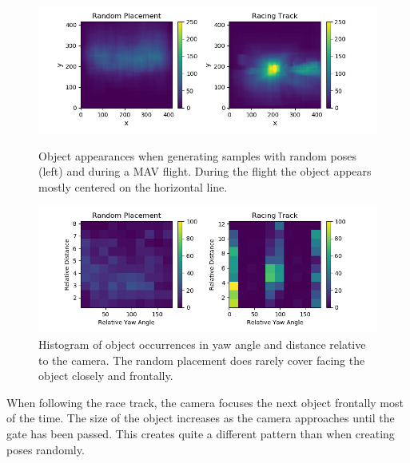 \begin{figure}
	\begin{minipage}{\textwidth}
		\includegraphics[width=\textwidth]{fig/heatmap_camplace}
		\caption{Object appearances when generating samples with random poses (left) and during a \ac{MAV} flight. During the flight the object appears mostly centered on the horizontal line.}
		\label{fig:heatmap_camplace}
	\end{minipage}
	\begin{minipage}{\textwidth}
		\includegraphics[width=\textwidth]{fig/hist2d_camplace}
		\caption{Histogram of object occurrences in yaw angle and distance relative to the camera. The random placement does rarely cover facing the object closely and frontally. }
		\label{fig:hist2d_camplace}
	\end{minipage}
\end{figure}

When following the race track, the camera focuses the next object frontally most of the time. The size of the object increases as the camera approaches until the gate has been passed. This creates quite a different pattern than when creating poses randomly.

